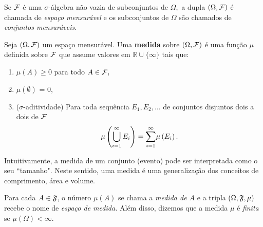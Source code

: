 \begin{frame}
\begin{defi}
Se ${\cal F}$ é uma $\sigma$-álgebra
não vazia de subconjuntos de $\Omega,$  a dupla $(\Omega, {\cal F})$ é chamada
de {\it espaço mensurável} e os subconjuntos de $\Omega$ são chamados de
{\it conjuntos mensuráveis}. 
\end{defi}



\begin{defi}[Medida] Seja  $(\Omega, {\cal F})$  um espaço mensurável. Uma {\bf medida} sobre  $(\Omega, {\cal F})$  é uma função $\mu$ 
definida sobre ${\cal F}$ que assume valores em $\mathbb{R} \cup \{\infty\}$ tais que:
\begin{enumerate}
\item  $\mu (A) \geq 0$ para todo $A \in {\cal F},$

\item  $\mu(\emptyset)$ = 0,
\item  ($\sigma$-aditividade)   Para toda sequência $E_{1},E_{2},\ldots$ de conjuntos disjuntos dois a dois de ${\cal F} $ $$\mu \left( \bigcup _{i=1}^{\infty }E_{i}\right) =\overset{\infty }{%
	\underset{i=1}{\sum }}\mu \left( E_{i}\right) .$$ 
\end{enumerate}
\end{defi}

Intuitivamente, a medida de um conjunto (evento) pode ser interpretada como o seu ``tamanho". Neste sentido, uma medida é uma generalização dos conceitos de comprimento, área e volume.

\begin{nota}
Para cada $A\in \frak{F}$,  o número $\mu \left( A\right) $ se chama a {\it medida de $A$} e a tripla $\left( \Omega ,\frak{F,\mu }\right) $ recebe o nome de
{\it espaço de medida.} Além disso, dizemos que a medida $\mu $ é {\it finita} se $\mu \left( \Omega \right) <\infty .$
\end{nota}
\end{frame}


